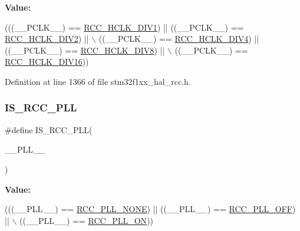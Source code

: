 {\bfseries Value\+:}
\begin{DoxyCode}
(((\_\_PCLK\_\_) == \hyperlink{group___r_c_c___a_p_b1___a_p_b2___clock___source_ga8e3fcdef0e5d77bb61a52420fe1e9fbc}{RCC\_HCLK\_DIV1}) || ((\_\_PCLK\_\_) == \hyperlink{group___r_c_c___a_p_b1___a_p_b2___clock___source_ga4d2ebcf280d85e8449a5fb7b994b5169}{RCC\_HCLK\_DIV2}) || \(\backslash\)
                               ((\_\_PCLK\_\_) == \hyperlink{group___r_c_c___a_p_b1___a_p_b2___clock___source_ga85b5f4fd936e22a3f4df5ed756f6e083}{RCC\_HCLK\_DIV4}) || ((\_\_PCLK\_\_) == 
      \hyperlink{group___r_c_c___a_p_b1___a_p_b2___clock___source_gadb18bc60e2c639cb59244bedb54f7bb3}{RCC\_HCLK\_DIV8}) || \(\backslash\)
                               ((\_\_PCLK\_\_) == \hyperlink{group___r_c_c___a_p_b1___a_p_b2___clock___source_ga27ac27d48360121bc2dc68b99dc8845d}{RCC\_HCLK\_DIV16}))
\end{DoxyCode}


Definition at line 1366 of file stm32f1xx\+\_\+hal\+\_\+rcc.\+h.

\mbox{\label{group___r_c_c___private___macros_ga4e8a1f3a151c3011e915df4da312dd73}} 
\subsubsection{\texorpdfstring{I\+S\+\_\+\+R\+C\+C\+\_\+\+P\+LL}{IS\_RCC\_PLL}}
{\footnotesize\ttfamily \#define I\+S\+\_\+\+R\+C\+C\+\_\+\+P\+LL(\begin{DoxyParamCaption}\item[{}]{\+\_\+\+\_\+\+P\+L\+L\+\_\+\+\_\+ }\end{DoxyParamCaption})}

{\bfseries Value\+:}
\begin{DoxyCode}
(((\_\_PLL\_\_) == \hyperlink{group___r_c_c___p_l_l___config_gae47a612f8e15c32917ee2181362d88f3}{RCC\_PLL\_NONE}) || ((\_\_PLL\_\_) == \hyperlink{group___r_c_c___p_l_l___config_ga3a8d5c8bcb101c6ca1a574729acfa903}{RCC\_PLL\_OFF}) || \(\backslash\)
                             ((\_\_PLL\_\_) == \hyperlink{group___r_c_c___p_l_l___config_gaf86dbee130304ba5760818f56d34ec91}{RCC\_PLL\_ON}))
\end{DoxyCode}



